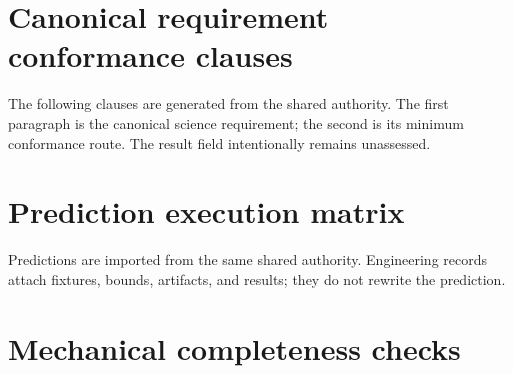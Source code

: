 \documentclass[10pt]{article}
\newcommand{\MaybeRequirementBreak}[1]{%
  \ifcsname SCIMapRequirementBreak#1\endcsname
    \csname SCIMapRequirementBreak#1\endcsname
  \fi}
\begin{document}
\clearpage
\section{Canonical requirement conformance clauses}\label{sec:requirements}

The following clauses are generated from the shared authority. The first
paragraph is the canonical science requirement; the second is its minimum
conformance route. The result field intentionally remains unassessed.

\renewcommand{\SCIMapRequirement}[4]{%
  \MaybeRequirementBreak{#1}%
  \phantomsection\label{engreq:#1}%
  \noindent\textbf{\textcolor{EngNavy}{#1} -- #2}\par
  \textbf{Canonical clause:} #3\par
  \textbf{Minimum conformance evidence:} #4\par
  \textbf{Result:} \textcolor{EngGray}{UNASSESSED}\par
  \smallskip\hrule\smallskip}
\begin{sloppypar}\small
\SCIMapRequirements
\end{sloppypar}\normalsize

\clearpage
\section{Prediction execution matrix}\label{sec:predictions}

Predictions are imported from the same shared authority. Engineering records
attach fixtures, bounds, artifacts, and results; they do not rewrite the
prediction.

\renewcommand{\SCIMapPrediction}[4]{%
  \par\begin{minipage}{\linewidth}%
  \phantomsection\label{engpred:#1}%
  \noindent\textbf{\textcolor{EngNavy}{#1} -- #2}\par
  \textbf{Canonical prediction:} #3\par
  \textbf{Primary claim layer:} #4.\par
  \textbf{Fixture / bound / result:} \textcolor{EngGray}{TO BE PREREGISTERED}\par
  \smallskip\hrule
  \end{minipage}\par\smallskip}
\SCIMapPredictions

\clearpage
\section{Mechanical completeness checks}
\end{document}
